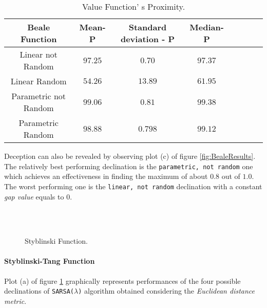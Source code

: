 \begin{table}[h!]
	\centering
	\resizebox{\linewidth}{!} {
		\begin{tabular}{c| ccccccc} 
			\hline \textbf{Beale Function}
			& \textbf{Mean- P} & \textbf{Standard deviation - P}  &\textbf{Median- P} \\ 
			\hline Linear not Random
			& $97.25$ & \cellcolor{green!25}$0.70$ & $97.37$  \\ 
			\hline Linear Random
			& $54.26$ & $13.89$ & \cellcolor{green!25}$61.95$ \\ 
			\hline Parametric not Random
			& \cellcolor{green!25}$99.06$ & $0.81$ & $99.38$ \\ 
			\hline Parametric Random
			& $98.88$ & $0.798$ & $99.12$ \\ 
			\hline 
		\end{tabular} 
}
	\label{BealeTabProximity}
	\caption{Value Function' s Proximity.} 
\end{table}

Deception can also be revealed by observing plot (c) of figure \ref{fig:BealeResults}. The relatively best performing declination is the {\tt parametric, not random} one which achieves an effectiveness in finding the maximum of about $0.8$ out of $1.0$. The worst performing one is the {\tt linear, not random} declination with a constant \textit{gap value} equals to $0$.

\begin{figure}[h!]
	\begin{center}
		\\
		 \\
		
	\end{center}
	\caption{
		Styblinski Function.
	}
	\label{fig:StyblinskiResults}
\end{figure}

\paragraph{Styblinski-Tang Function} Plot (a) of figure \ref{fig:StyblinskiResults} graphically represents performances of the four possible declinations of {\tt SARSA($\lambda$)} algorithm obtained considering the \textit{Euclidean distance metric}. 

